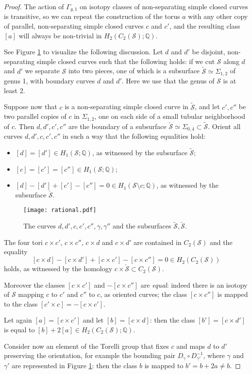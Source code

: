 \documentclass{amsart}
\theoremstyle{plain}
\theoremstyle{definition}
\newcommand{\Q}{\mathbb{Q}}
\renewcommand{\S}{\mathcal{S}}
\renewcommand{\gg}{\Gamma_{g,1}}
\begin{document}
\begin{proof}
The action of $\gg$ on isotopy classes of non-separating simple closed curves is transitive, so we can repeat
the construction of the torus $a$ with any other copy of parallel, non-separating simple closed curves
$c$ and $c'$, and the resulting class $[a]$ will always be non-trivial in $H_2(C_2(\S);\Q)$.

See Figure \ref{fig:rational} to visualize the following discussion.
Let $d$ and $d'$ be disjoint, non-separating simple closed curves such that
the following holds: if we cut $\S$ along $d$ and $d'$ we separate $\S$ into two pieces, one of
which is a subsurface $\tilde{\S}\simeq\Sigma_{1,2}$ of genus 1, with boundary
curves $d$ and $d'$. Here we use that the genus of $\S$ is at least 2.

Suppose now that $c$ is a non-separating simple closed curve in $\tilde{\S}$,
and let $c',c''$ be two parallel copies of $c$ in $\Sigma_{1,2}$, one on each side of a small tubular
neighborhood of $c$.
Then $d,d',c',c''$ are the boundary of a subsurface $\check{\S}\simeq\Sigma_{0,4}\subset\tilde{\S}$.
Orient all curves $d,d',c,c',c''$ in such a way that the following equalities hold:
\begin{itemize}
 \item $[d]=[d']\in H_1(\S;\Q)$, as witnessed by the subsurface $\tilde{\S}$;
 \item $[c]=[c']=[c'']\in H_1(\S;\Q)$;
 \item $[d]-[d']+[c']-[c'']=0\in H_1(\S\setminus c;\Q)$, as witnessed by the subsurface $\check{\S}$.
\end{itemize}

\begin{figure}[ht]\centering
 \texttt{[image: rational.pdf]}
 \caption{The curves $d,d',c,c',c'',\gamma,\gamma''$ and the subsurfaces $\tilde{\S},\check{\S}$.}
\label{fig:rational}
\end{figure}

The four tori $c\times c'$, $c\times c''$, $c\times d$ and $c\times d'$ are contained in $C_2(\S)$
and the equality
\[
 [c\times d]-[c\times d']+[c\times c']-[c\times c'']=0\in H_2(C_2(\S))
\]
holds, as witnessed by the homology $c\times \check{\S}\subset C_2(\S)$.

Moreover the classes $[c\times c']$ and $-[c\times c'']$ are \emph{equal}:
indeed there is an isotopy of $\S$ mapping $c$ to $c'$ and $c''$ to $c$,
as oriented curves; the class $[c\times c'']$ is mapped to the class $[c'\times c]=-[c\times c']$.

Let again $[a]=[c\times c']$ and let $[b]=[c\times d]$: then the class $[b']=[c\times d']$
is equal to $[b]+2[a]\in H_2(C_2(\S);\Q)$.

Consider now an element of the Torelli group that fixes $c$ and maps $d$ to $d'$ preserving
the orientation, for example the bounding pair $D_{\gamma}\circ D_{\gamma'}^{-1}$, where
$\gamma$ and $\gamma'$ are represented in Figure \ref{fig:rational}:
then the class $b$ is mapped to $b'=b+2a\neq b$.
\end{proof}
\end{document}
